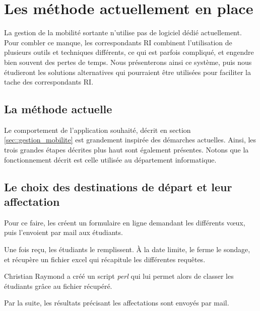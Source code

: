 
		\section{Les méthode actuellement en place}
	

La gestion de la mobilité sortante n'utilise pas de logiciel dédié actuellement. Pour combler ce manque, les correspondants RI combinent l'utilisation de plusieurs outils et techniques différents, ce qui est parfois compliqué, et engendre bien souvent des pertes de temps. Nous présenterons ainsi ce système, puis nous étudieront  les solutions alternatives qui pourraient être utilisées pour faciliter la tache des correspondants RI. 

\subsection{La méthode actuelle}

Le comportement de l'application souhaité, décrit en section \ref{sec::gestion_mobilite} est grandement inspirée des démarches actuelles. Ainsi, les trois grandes étapes décrites plus haut sont également présentes. Notons que la fonctionnement  décrit est celle utilisée au département informatique.  
 \subsection{Le choix des destinations de départ et leur affectation}
		 
		Pour ce faire, les \ris créent un formulaire en ligne demandant les différents vœux, puis l'envoient par mail aux étudiants. 
		
		Une fois reçu, les étudiants le remplissent. À la date limite, le \ri ferme le sondage, et récupère un fichier excel qui récapitule les différentes requêtes. 
		
		Christian Raymond a créé un script \textit{perl} qui lui permet alors de classer les étudiants grâce au fichier récupéré.
		
		Par la suite, les résultats  précisant les affectations sont envoyés par mail. 
		
		\medbreak
		
